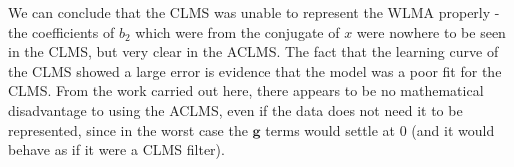 \documentclass[./main.tex]{subfiles}
\begin{document}
We can conclude that the CLMS was unable to represent the WLMA properly - the coefficients of $b_2$ which were from the conjugate of $x$ were nowhere to be seen in the CLMS, but very clear in the ACLMS. The fact that the learning curve of the CLMS showed a large error is evidence that the model was a poor fit for the CLMS. From the work carried out here, there appears to be no mathematical disadvantage to using the ACLMS, even if the data does not need it to be represented, since in the worst case the $ \mathbf{g} $ terms would settle at 0 (and it would behave as if it were a CLMS filter).






%  	


 		
\end{document}
